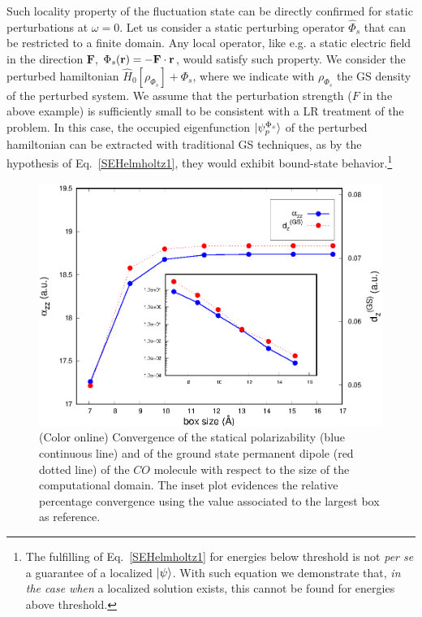 \documentclass[reprint,aps,prb]{revtex4-1}
\renewcommand{\r}{{\bf r}}
\newcommand{\op}[1]{\hat {#1}}
\newcommand{\hnot}{\op{H}_0}
\begin{document}
Such locality property of the fluctuation state can be directly confirmed for static perturbations at $\omega=0$.
Let us consider a static perturbing operator $\op\Phi_s$ that can be restricted to a finite domain. 
Any local operator, like e.g. a static electric field in the direction $\mathbf F$, $\Phi_s(\r) = -\mathbf F \cdot \r$, would satisfy such property.
We consider the perturbed hamiltonian $\hnot[\rho_{\Phi_s}] + \Phi_s$, where we indicate with $\rho_{\Phi_s}$ the GS density of the
perturbed system. We assume that the perturbation strength ($F$ in the above example) is sufficiently small to be consistent with a LR 
treatment of the problem. 
In this case, the occupied eigenfunction $\ket{\psi_p^{\Phi_s}}$ of the perturbed hamiltonian 
can be extracted with traditional GS techniques, as by the hypothesis of Eq.~\eqref{SEHelmholtz1},
they would exhibit bound-state behavior.\footnote{The fulfilling of Eq.~\eqref{SEHelmholtz1} for energies below threshold
is not \textit{per se} a guarantee of a localized $\ket{\psi}$. With such equation we demonstrate that, \emph{in the case when} a localized
solution exists, this cannot be found for energies above threshold.}
\begin{figure}[t]
\includegraphics[scale=0.68]{CO_statPolvsBox.eps}
\caption{\label{co_alphaStatic}(Color online) Convergence of the statical polarizability (blue continuous line) and of the ground state permanent dipole (red dotted line) 
of the $CO$ molecule with respect to the size of the computational domain. The inset plot evidences the relative percentage convergence using the value associated to the largest 
box as reference.}
\end{figure}
\end{document}
